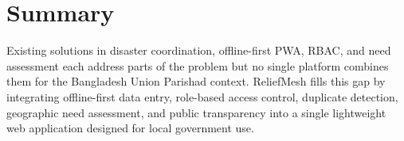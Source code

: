 \section{Summary}

Existing solutions in disaster coordination, offline-first PWA, RBAC, and need assessment each address parts of the problem but no single platform combines them for the Bangladesh Union Parishad context. ReliefMesh fills this gap by integrating offline-first data entry, role-based access control, duplicate detection, geographic need assessment, and public transparency into a single lightweight web application designed for local government use.
